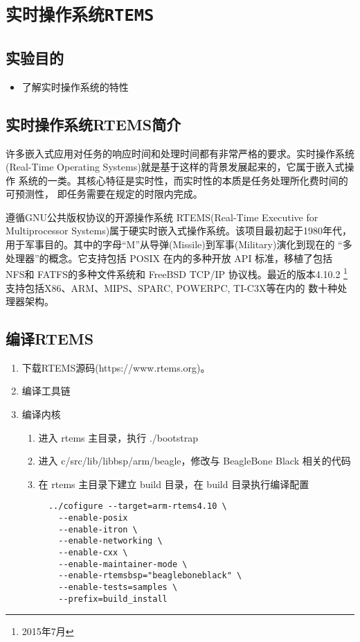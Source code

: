 \chapter{\tt 实时操作系统RTEMS}
\section{实验目的}
\begin{itemize}\itemsep=-3pt
  \item 了解实时操作系统的特性
\end{itemize}

\section{实时操作系统RTEMS简介}
	许多嵌入式应用对任务的响应时间和处理时间都有非常严格的要求。实时操作系统
(Real-Time Operating Systems)就是基于这样的背景发展起来的，它属于嵌入式操作
系统的一类。其核心特征是实时性，而实时性的本质是任务处理所化费时间的可预测性，
即任务需要在规定的时限内完成。

	遵循GNU公共版权协议的开源操作系统 RTEMS(Real-Time Executive for
Multiprocessor Systems)属于硬实时嵌入式操作系统。该项目最初起于1980年代，
用于军事目的。其中的字母``M''从导弹(Missile)到军事(Military)演化到现在的
``多处理器''的概念。它支持包括 POSIX 在内的多种开放 API 标准，移植了包括
NFS和 FATFS的多种文件系统和 FreeBSD TCP/IP 协议栈。最近的版本4.10.2
\footnote{2015年7月} 支持包括X86、ARM、MIPS、SPARC, POWERPC, TI-C3X等在内的
数十种处理器架构。

\section{编译RTEMS}
\begin{enumerate}
  \item 下载RTEMS源码(https://www.rtems.org)。
  \item 编译工具链
  \item 编译内核
  \begin{enumerate}
    \item 进入 rtems 主目录，执行 ./bootstrap
	\item 进入 c/src/lib/libbsp/arm/beagle，修改与 BeagleBone Black 相关的代码
	\item 在 rtems 主目录下建立 build 目录，在 build 目录执行编译配置
\begin{verbatim}
  ../cofigure --target=arm-rtems4.10 \
    --enable-posix
    --enable-itron \
    --enable-networking \
    --enable-cxx \
    --enable-maintainer-mode \
    --enable-rtemsbsp="beagleboneblack" \
    --enable-tests=samples \
    --prefix=build_install
\end{verbatim}
  \end{enumerate}
\end{enumerate}

